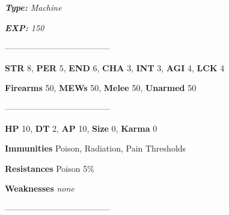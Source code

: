 \documentclass[11pt,a4paper,twocolumn]{book}
\begin{document}
	\noindent
	\emph{\textbf{Type:} Machine}
	
	\noindent
	\emph{\textbf{EXP:} 150}
	
%		
%	
%		

	--------------------------------------

	\noindent
	\textbf{STR} 8, \textbf{PER} 5, \textbf{END} 6, \textbf{CHA} 3, \textbf{INT} 3, \textbf{AGI} 4, \textbf{LCK} 4
	
	\noindent
	\textbf{Firearms} 50, \textbf{MEWs} 50, \textbf{Melee} 50, \textbf{Unarmed} 50
	
	--------------------------------------
	
	\noindent
	\textbf{HP} 10, \textbf{DT} 2, \textbf{AP} 10, \textbf{Size} 0, \textbf{Karma} 0
	
	
	\noindent
	\textbf{Immunities} Poison, Radiation, Pain Thresholds
	
	\noindent
	\textbf{Resistances} Poison 5\%
	
	\noindent
	\textbf{Weaknesses} \emph{none} %
	
	--------------------------------------
	
\end{document}
